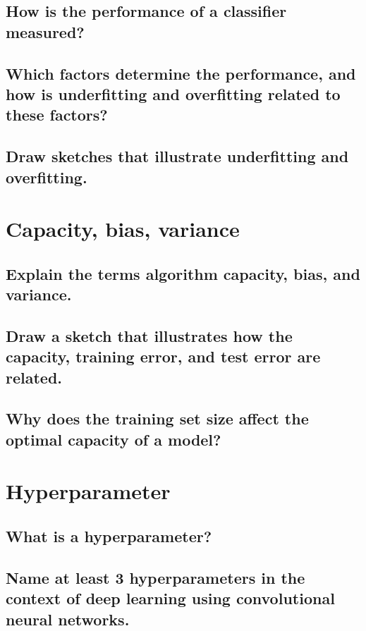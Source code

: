 \subsection{How is the performance of a classifier measured?}

\subsection{Which factors determine the performance, and how is underfitting and overfitting related to these factors?}

\subsection{Draw sketches that illustrate underfitting and overfitting.}

\section{Capacity, bias, variance}

\subsection{Explain the terms algorithm capacity, bias, and variance.}

\subsection{Draw a sketch that illustrates how the capacity, training error, and test error are related.}

\subsection{Why does the training set size affect the optimal capacity of a model?}

\section{Hyperparameter}

\subsection{What is a hyperparameter?}

\subsection{Name at least 3 hyperparameters in the context of deep learning using convolutional neural networks.}

